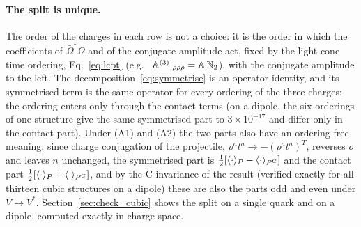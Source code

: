 \paragraph{The split is unique.} The order of the charges in each row is not a choice: it is the order in which the coefficients of $\bar\Omega^\dagger\Omega$ and of the conjugate amplitude act, fixed by the light-cone time ordering, Eq.~\eqref{eq:lcpt} (e.g.\ $[\mathbb{A}^{(3)}]_{\rho\rho\rho}=\mathbb{A}\,\mathbb{N}_2$), with the conjugate amplitude to the left. The decomposition~\eqref{eq:symmetrise} is an operator identity, and its symmetrised term is the same operator for every ordering of the three charges: the ordering enters only through the contact terms (on a dipole, the six orderings of one structure give the same symmetrised part to $3\times10^{-17}$ and differ only in the contact part). Under (A1) and (A2) the two parts also have an ordering-free meaning: since charge conjugation of the projectile, $\rho^at^a\to-(\rho^at^a)^T$, reverses $o$ and leaves $n$ unchanged, the symmetrised part is $\frac12[\langle\cdot\rangle_P-\langle\cdot\rangle_{P^{\rm C}}]$ and the contact part $\frac12[\langle\cdot\rangle_P+\langle\cdot\rangle_{P^{\rm C}}]$, and by the C-invariance of the result (verified exactly for all thirteen cubic structures on a dipole) these are also the parts odd and even under $V\to V^*$. Section~\ref{sec:check_cubic} shows the split on a single quark and on a dipole, computed exactly in charge space.


